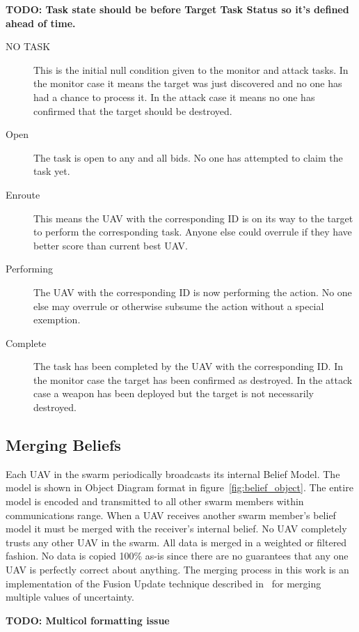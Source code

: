 \begin{multicols*}{2}
\textbf{TODO: Task state should be before Target Task Status so it's defined ahead of time.}

\begin{description}
	\item [NO TASK] This is the initial null condition given to the monitor and attack tasks.  In the monitor case it means the target was just discovered and no one has had a chance to process it.  In the attack case it means no one has confirmed that the target should be destroyed.
	\item [Open] The task is open to any and all bids.  No one has attempted to claim the task yet.
	\item [Enroute] This means the UAV with the corresponding ID is on its way to the target to perform the corresponding task.  Anyone else could overrule if they have better score than current best UAV.
	\item [Performing] The UAV with the corresponding ID is now performing the action.  No one else may overrule or otherwise subsume the action without a special exemption.%
	\item [Complete] The task has been completed by the UAV with the corresponding ID.  In the monitor case the target has been confirmed as destroyed.  In the attack case a weapon has been deployed but the target is not necessarily destroyed.
\end{description}

\subsection{Merging Beliefs}
Each UAV in the swarm periodically broadcasts its internal Belief Model.  The model is shown in Object Diagram format in figure~\ref{fig:belief_object}.  The entire model is encoded and transmitted to all other swarm members within communications range.   When a UAV receives another swarm member's belief model it must be merged with the receiver's internal belief.  No UAV completely trusts any other UAV in the swarm.  All data is merged in a weighted or filtered fashion.  No data is copied 100\% as-is since there are no guarantees that any one UAV is perfectly correct about anything.  The merging process in this work is an implementation of the Fusion Update technique described in~\cite{shem} for merging multiple values of uncertainty.

\textbf{TODO: Multicol formatting issue}
\end{multicols*}
